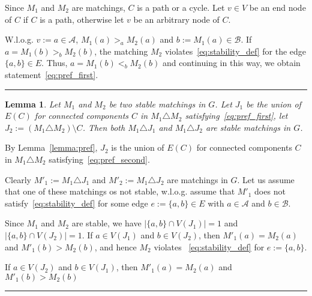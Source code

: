 \documentclass[preprint]{elsarticle}
\newtheorem{lemma}[fact]{Lemma}
\newenvironment{proof}{{\bf Proof:  }}{\hfill\rule{2mm}{2mm}}
\begin{document}
\begin{proof}
Since $M_1$ and $M_2$ are matchings, $C$ is a path or a cycle. Let $v\in V$ be an end node of $C$ if $C$ is a path, otherwise let $v$ be an arbitrary node of $C$. 

W.l.o.g. $v:=a\in \mathcal{A}$, $M_1(a) >_a M_2(a)$ and $b:=M_1(a)\in\mathcal{B}$. If $a=M_1(b) >_b M_2(b)$, the matching $M_2$ violates~\eqref{eq:stability_def} for the edge $\{a,b\}\in E$. Thus, $a=M_1(b) <_b M_2(b)$ and continuing in this way, we obtain statement~\eqref{eq:pref_first}.

\end{proof}


\begin{lemma}\label{lemma:sym_stable} 
Let $M_1$ and $M_2$ be two stable matchings in $G$. Let $J_1$ be the union of $E(C)$ for connected components $C$ in $M_1 \triangle M_2$ satisfying~\eqref{eq:pref_first}, let $J_2:=(M_1\triangle M_2)\setminus C$. Then both $M_1\triangle J_1$ and $M_1\triangle J_2$ are stable matchings in $G$.
\end{lemma}
\begin{proof}
By Lemma~\ref{lemma:pref}, $J_2$ is the union of $E(C)$ for connected components $C$ in $M_1 \triangle M_2$ satisfying~\eqref{eq:pref_second}.

Clearly $M'_1:=M_1\triangle J_1$ and $M'_2:=M_1\triangle J_2$ are matchings in $G$. Let us assume that one of these matchings os not stable, w.l.o.g. assume that $M'_1$ does not satisfy~\eqref{eq:stability_def} for some edge $e:=\{a,b\}\in E$ with $a\in\mathcal{A}$ and $b\in\mathcal{B}$. 

Since $M_1$ and $M_2$ are stable, we have $|\{a,b\}\cap V(J_1)|=1$ and $|\{a,b\}\cap V(J_2)|=1$.
If $a\in V(J_1)$ and $b\in V(J_2)$, then $M'_1(a)=M_2(a)$ and $M'_1(b)>M_2(b)$, and hence $M_2$ violates ~\eqref{eq:stability_def} for $e:=\{a,b\}$.{\color{red} If $a\in V(J_2)$ and $b\in V(J_1)$, then $M'_1(a)=M_2(a)$ and $M'_1(b)>M_2(b)$





}
\end{proof}
\end{document}
